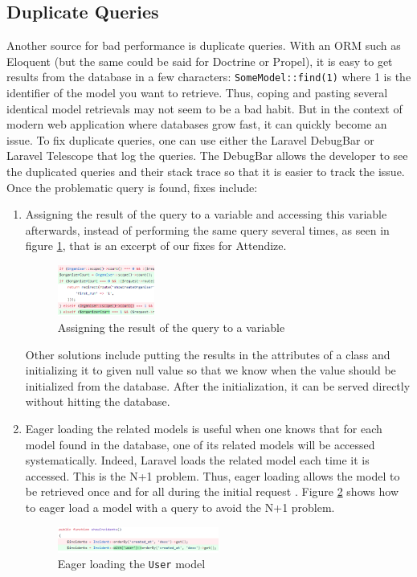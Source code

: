 \documentclass[sigconf]{acmart}
\begin{document}
\subsection{Duplicate Queries}
Another source for bad performance is duplicate queries. With an ORM such as Eloquent (but the same could be said for Doctrine or Propel), it is easy to get results from the database in a few characters: \texttt{SomeModel::find(1)} where 1 is the identifier of the model you want to retrieve. Thus, coping and pasting several identical model retrievals may not seem to be a bad habit. But in the context of modern web application where databases grow fast, it can quickly become an issue. To fix duplicate queries, one can use either the Laravel DebugBar or Laravel Telescope that log the queries. The DebugBar allows the developer to see the duplicated queries and their stack trace so that it is easier to track the issue. Once the problematic query is found, fixes include:
\begin{enumerate}
\item Assigning the result of the query to a variable and accessing this variable afterwards, instead of performing the same query several times, as seen in figure \ref{variablefix}, that is an excerpt of our fixes for Attendize.
\begin{figure}[h!]
\includegraphics[width=0.3\textwidth]{variablefix}
\caption{Assigning the result of the query to a variable}
\label{variablefix}
\end{figure}
\newpage
Other solutions include putting the results in the attributes of a class and initializing it to given null value so that we know when the value should be initialized from the database. After the initialization, it can be served directly without hitting the database.
\item Eager loading the related models is useful when one knows that for each model found in the database, one of its related models will be accessed systematically. Indeed, Laravel loads the related model each time it is accessed. This is the N+1 problem. Thus, eager loading allows the model to be retrieved once and for all during the initial request \cite{eagerloading}. Figure \ref{eagerload} shows how to eager load a model with a query to avoid the N+1 problem.
\begin{figure}[h!]
\includegraphics[width=0.5\textwidth]{eagerload}
\caption{Eager loading the \texttt{User} model}
\label{eagerload}
\end{figure}
\end{enumerate}
\end{document}
